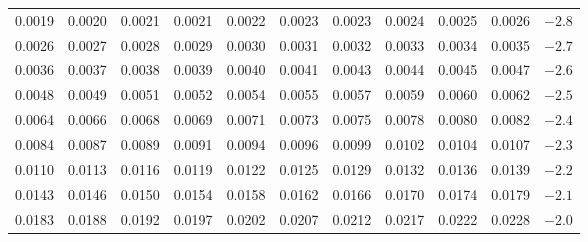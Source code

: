\begin{table}[p]
\begin{center}
{\begin{tabular}{| rrrrr | rrrrr | c}
  \footnotesize{0.0019} & \footnotesize{0.0020} & \footnotesize{0.0021} & \footnotesize{0.0021} & \footnotesize{0.0022} & \footnotesize{0.0023} & \footnotesize{0.0023} & \footnotesize{0.0024} & \footnotesize{0.0025} & \footnotesize{0.0026} & $-2.8$ \\
  \footnotesize{0.0026} & \footnotesize{0.0027} & \footnotesize{0.0028} & \footnotesize{0.0029} & \footnotesize{0.0030} & \footnotesize{0.0031} & \footnotesize{0.0032} & \footnotesize{0.0033} & \footnotesize{0.0034} & \footnotesize{0.0035} & $-2.7$ \\
  \footnotesize{0.0036} & \footnotesize{0.0037} & \footnotesize{0.0038} & \footnotesize{0.0039} & \footnotesize{0.0040} & \footnotesize{0.0041} & \footnotesize{0.0043} & \footnotesize{0.0044} & \footnotesize{0.0045} & \footnotesize{0.0047} & $-2.6$ \\
  \footnotesize{0.0048} & \footnotesize{0.0049} & \footnotesize{0.0051} & \footnotesize{0.0052} & \footnotesize{0.0054} & \footnotesize{0.0055} & \footnotesize{0.0057} & \footnotesize{0.0059} & \footnotesize{0.0060} & \footnotesize{0.0062} & $-2.5$ \\
    \hline
  \footnotesize{0.0064} & \footnotesize{0.0066} & \footnotesize{0.0068} & \footnotesize{0.0069} & \footnotesize{0.0071} & \footnotesize{0.0073} & \footnotesize{0.0075} & \footnotesize{0.0078} & \footnotesize{0.0080} & \footnotesize{0.0082} & $-2.4$ \\
  \footnotesize{0.0084} & \footnotesize{0.0087} & \footnotesize{0.0089} & \footnotesize{0.0091} & \footnotesize{0.0094} & \footnotesize{0.0096} & \footnotesize{0.0099} & \footnotesize{0.0102} & \footnotesize{0.0104} & \footnotesize{0.0107} & $-2.3$ \\
  \footnotesize{0.0110} & \footnotesize{0.0113} & \footnotesize{0.0116} & \footnotesize{0.0119} & \footnotesize{0.0122} & \footnotesize{0.0125} & \footnotesize{0.0129} & \footnotesize{0.0132} & \footnotesize{0.0136} & \footnotesize{0.0139} & $-2.2$ \\
  \footnotesize{0.0143} & \footnotesize{0.0146} & \footnotesize{0.0150} & \footnotesize{0.0154} & \footnotesize{0.0158} & \footnotesize{0.0162} & \footnotesize{0.0166} & \footnotesize{0.0170} & \footnotesize{0.0174} & \footnotesize{0.0179} & $-2.1$ \\
  \footnotesize{0.0183} & \footnotesize{0.0188} & \footnotesize{0.0192} & \footnotesize{0.0197} & \footnotesize{0.0202} & \footnotesize{0.0207} & \footnotesize{0.0212} & \footnotesize{0.0217} & \footnotesize{0.0222} & \footnotesize{0.0228} & $-2.0$ \\

\end{tabular}}
\end{center}
\end{table}
